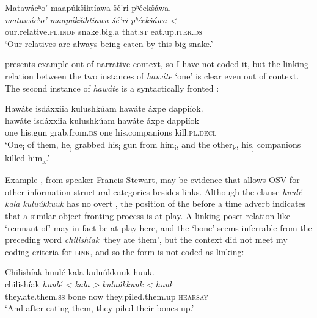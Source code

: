 \documentclass[output=paper]{LSP/langsci}
\begin{document}
\ea\label{eagleosv}
Matawácʰo’ maapúkšihtíawa šé’ri pʰéekšáwa.\footnotemark\\
\gll	\emph{\underline{matawácʰo’}}		\emph{maapúkšihtíawa} 	\emph{šé’ri} 	\emph{pʰéekšáwa <}\\
	our.relative.\textsc{pl.indf} 		snake.big.a 			that.\textsc{st} 	eat.up.\textsc{iter.ds}\\
\glt	`Our relatives are always being eaten by this big snake.'
\z


\citet[102]{Graczyk1991a} presents  example  out of narrative context, so I have not coded it, but the linking relation between the two instances of \emph{hawáte} `one' is clear even out of context. The second instance of \emph{hawáte} is a syntactically fronted :
\largerpage[2]

\ea\label{apsaalookeosv}
	Hawáte isdáxxiia kulushkúam hawáte áxpe dappiíok.\\
\gll	hawáte 	isdáxxiia 	kulushkúam			hawáte 	áxpe 			dappiíok\\
	one 		his.gun 	grab.from.\textsc{ds} 	one 		his.companions	kill.\textsc{pl.decl}\\
\glt	`One\textsubscript{i} of them, he\textsubscript{j} grabbed his\textsubscript{i} gun from him\textsubscript{i}, and the other\textsubscript{k}, his\textsubscript{j} companions killed him\textsubscript{k}.'
\z

Example , from speaker Francis Stewart, may be evidence that  allows OSV for other information-structural categories besides links. Although the clause \emph{huulé kala kuluúkkuuk} has no overt , the position of the  before a time adverb indicates that a similar object-fronting process is at play. A linking poset relation like `remnant of' may in fact be at play here, and the  `bone' seems inferrable from the preceding word \emph{chilishíak} `they ate them', but the context did not meet my coding criteria for \textsc{link}, and so the form is not coded as linking:

\ea\label{stewartosv}
Chilishíak huulé kala kuluúkkuuk huuk.\footnotemark\\
\gll	chilishíak 				\emph{huulé <}	\emph{kala >}	\emph{kuluúkkuuk <}	\emph{huuk}\\
	they.ate.them.\textsc{ss} 	bone 			now 			they.piled.them.up 		\textsc{hearsay}\\
\glt	`And after eating them, they piled their bones up.'
\z
\end{document}
